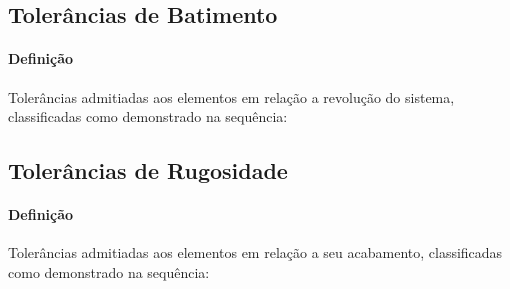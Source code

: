\documentclass{article}
\begin{document}
        \subsection{Tolerâncias de Batimento}
            \paragraph{Definição}Tolerâncias admitiadas aos elementos em relação a revolução do sistema, classificadas como demonstrado na sequência:
            
        \subsection{Tolerâncias de Rugosidade}
            \paragraph{Definição}Tolerâncias admitiadas aos elementos em relação a seu acabamento, classificadas como demonstrado na sequência:
\end{document}
